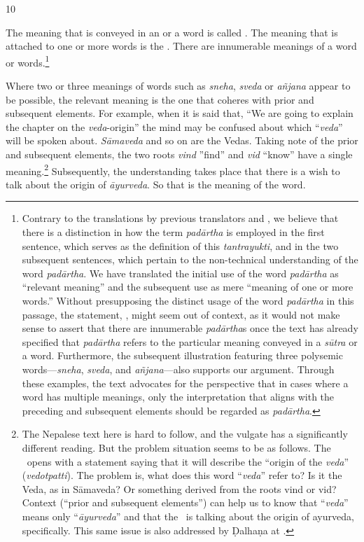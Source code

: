 \begin{translation}
\item [10]\label{padartha} 

The meaning that is conveyed in an  or a word is 
called . The meaning that is attached to 
one or more words is the . 
There are innumerable meanings of a word or 
words.\footnote{\label{fn.contrary}Contrary to the translations by previous 
translators 
	\citeauthor{sing-1980} and \citeauthor{shar-1999}, we believe that there is a 
distinction in how the term \emph{padārtha} is employed in the first sentence, 
which serves as the definition of this \emph{tantrayukti}, and in the two 
subsequent sentences, which pertain to the non-technical understanding of the 
word \emph{padārtha}. We have translated the initial use of the word 
\emph{padārtha} as “relevant meaning” and the subsequent use as mere 
“meaning of one or more words.” Without presupposing the distinct usage of the 
word \emph{padārtha} in this passage, the statement, , might seem out of context, as it would not make sense to assert that 
there are innumerable \emph{padārtha}s once the text has already specified 
that 
\emph{padārtha} refers to the particular meaning conveyed in a \emph{sūtra} 
or 
a word. Furthermore, the subsequent illustration featuring three polysemic 
words---\emph{sneha}, \emph{sveda}, and \emph{añjana}---also supports our 
argument. Through these examples, the text advocates for the perspective that 
in 
cases where a word has multiple meanings, only the interpretation that aligns 
with 
the preceding and subsequent elements should be regarded as 
\emph{padārtha}.} 

Where two or three meanings of words such as \emph{sneha}, \emph{sveda} or 
\emph{añjana} appear
to be possible, the relevant meaning is the one that coheres with prior
and subsequent elements.
For example, when it is said that, 
“We are going to explain the chapter on the \emph{veda}-origin” the mind may 
be confused about which “\emph{veda}” will be spoken about. 
\emph{Sāmaveda} 
and so on are the Vedas.
Taking note of the prior and subsequent elements, the two roots \emph{vind} 
”find” and \emph{vid} “know”
have a single meaning.\footnote{The Nepalese
    	text here is hard to follow, and the vulgate has a significantly
    	different reading. But the problem situation seems to be as follows.  The
    	\SS\ opens with a statement saying that it will describe the “origin of
    	the \emph{veda}” (\emph{vedotpatti}).  The problem is, what does this
    	word “\emph{veda}” refer to?  Is it the Veda, as in Sāmaveda?  Or
    	something derived from the roots \root vind or \root vid?  Context
    	(“prior and subsequent elements”) can help us to know that “\emph{veda}”
    	means only “\emph{āyurveda}” and that the \SS\ is talking about the
    	origin of ayurveda, specifically.  This same issue is also addressed by 
    	Ḍalhaṇa at .} 
Subsequently, the understanding takes place that there is a wish to talk about 
the origin of \emph{āyurveda}.  So that is the meaning of the word.


\end{translation}
